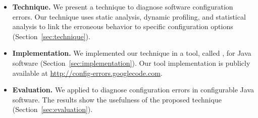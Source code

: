 \begin{itemize}

\item \textbf{Technique.} We present a technique to diagnose
software configuration errors. Our technique uses static analysis,
dynamic profiling, and statistical analysis to link the
erroneous behavior to specific configuration options (Section~\ref{sec:technique}).


\item \textbf{Implementation.} We implemented our technique 
in a tool, called \ourtool, for Java software (Section~\ref{sec:implementation}). Our tool implementation is publicly available at
\url{http://config-errors.googlecode.com}. 


\item \textbf{Evaluation.} We applied \ourtool to diagnose
\errors configuration errors in \subjectnum
configurable Java software. The results
show the usefulness of the proposed technique (Section~\ref{sec:evaluation}).

\end{itemize}



